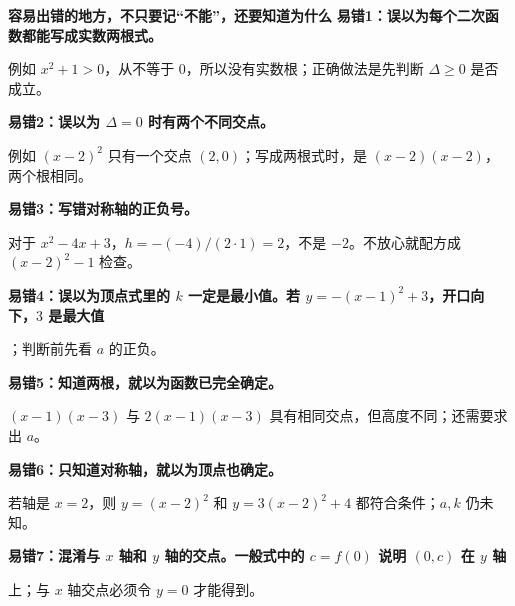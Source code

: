\clearpage
\begin{trapbox}
\textbf{\textcolor{CTrap}{容易出错的地方，不只要记“不能”，还要知道为什么}}
\textbf{\textcolor{CTrap}{易错1：误以为每个二次函数都能写成实数两根式。}}


例如 $x^2+1>0$，从不等于 $0$，所以没有实数根；正确做法是先判断 $\Delta\ge0$ 是否成立。


\end{trapbox}
\clearpage
\begin{trapbox}
\textbf{\textcolor{CTrap}{易错2：误以为 $\Delta=0$ 时有两个不同交点。}}


例如 $(x-2)^2$ 只有一个交点 $(2,0)$；写成两根式时，是 $(x-2)(x-2)$，两个根相同。


\end{trapbox}
\clearpage
\begin{trapbox}
\textbf{\textcolor{CTrap}{易错3：写错对称轴的正负号。}}


对于 $x^2-4x+3$，$h=-(-4)/(2\cdot1)=2$，不是 $-2$。不放心就配方成 $(x-2)^2-1$ 检查。


\end{trapbox}
\clearpage
\begin{trapbox}
\textbf{\textcolor{CTrap}{易错4：误以为顶点式里的 $k$ 一定是最小值。}若 $y=-(x-1)^2+3$，开口向下，$3$ 是\textbf{最大值}}


；判断前先看 $a$ 的正负。


\end{trapbox}
\clearpage
\begin{trapbox}
\textbf{\textcolor{CTrap}{易错5：知道两根，就以为函数已完全确定。}}


$(x-1)(x-3)$ 与 $2(x-1)(x-3)$ 具有相同交点，但高度不同；还需要求出 $a$。


\end{trapbox}
\clearpage
\begin{trapbox}
\textbf{\textcolor{CTrap}{易错6：只知道对称轴，就以为顶点也确定。}}


若轴是 $x=2$，则 $y=(x-2)^2$ 和 $y=3(x-2)^2+4$ 都符合条件；$a,k$ 仍未知。


\end{trapbox}
\clearpage
\begin{trapbox}
\textbf{\textcolor{CTrap}{易错7：混淆与 $x$ 轴和 $y$ 轴的交点。}一般式中的 $c=f(0)$ 说明 $(0,c)$ 在 \textbf{$y$ 轴}}


上；与 $x$ 轴交点必须令 $y=0$ 才能得到。


\end{trapbox}
